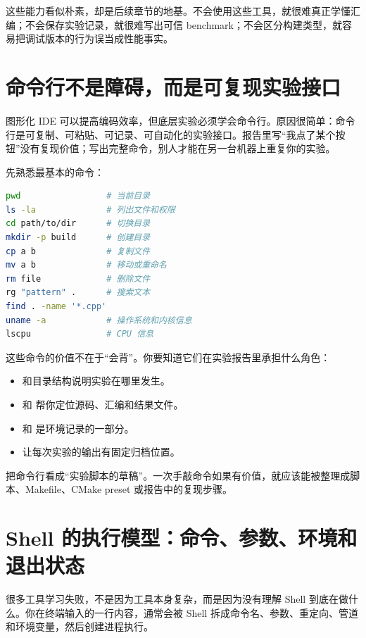 这些能力看似朴素，却是后续章节的地基。不会使用这些工具，就很难真正学懂汇编；不会保存实验记录，就很难写出可信 benchmark；不会区分构建类型，就容易把调试版本的行为误当成性能事实。

\section{命令行不是障碍，而是可复现实验接口}

图形化 IDE 可以提高编码效率，但底层实验必须学会命令行。原因很简单：命令行是可复制、可粘贴、可记录、可自动化的实验接口。报告里写“我点了某个按钮”没有复现价值；写出完整命令，别人才能在另一台机器上重复你的实验。

先熟悉最基本的命令：

\begin{lstlisting}[language=bash]
pwd                 # 当前目录
ls -la              # 列出文件和权限
cd path/to/dir      # 切换目录
mkdir -p build      # 创建目录
cp a b              # 复制文件
mv a b              # 移动或重命名
rm file             # 删除文件
rg "pattern" .      # 搜索文本
find . -name '*.cpp'
uname -a            # 操作系统和内核信息
lscpu               # CPU 信息
\end{lstlisting}

这些命令的价值不在于“会背”。你要知道它们在实验报告里承担什么角色：

\begin{itemize}
  \item {} 和目录结构说明实验在哪里发生。
  \item {} 和  帮你定位源码、汇编和结果文件。
  \item {} 和  是环境记录的一部分。
  \item {} 让每次实验的输出有固定归档位置。
\end{itemize}

\begin{mentalmodel}
把命令行看成“实验脚本的草稿”。一次手敲命令如果有价值，就应该能被整理成脚本、Makefile、CMake preset 或报告中的复现步骤。
\end{mentalmodel}

\section{Shell 的执行模型：命令、参数、环境和退出状态}

很多工具学习失败，不是因为工具本身复杂，而是因为没有理解 Shell 到底在做什么。你在终端输入的一行内容，通常会被 Shell 拆成命令名、参数、重定向、管道和环境变量，然后创建进程执行。

